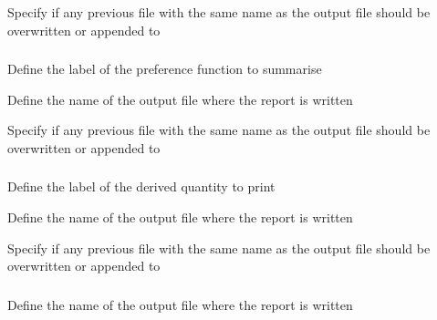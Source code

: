  {Specify if any previous file with the same name as the output file should be overwritten or appended to}

\subsubsection[Print a summary of a preference function]{}

 {Define the label of the preference function to summarise}

 {Define the name of the output file where the report is written}

 {Specify if any previous file with the same name as the output file should be overwritten or appended to}

\subsubsection[Print a derived quantity]{}

 {Define the label of the derived quantity to print}

 {Define the name of the output file where the report is written}

 {Specify if any previous file with the same name as the output file should be overwritten or appended to}

\subsubsection[Print a summary of the estimated parameters]{}

 {Define the name of the output file where the report is written}

